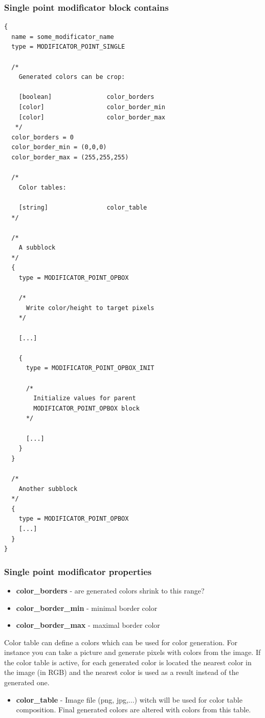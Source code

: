 \documentclass[9pt]{article}
\begin{document}
\subsubsection*{Single point modificator block contains}
\begin{verbatim}
{
  name = some_modificator_name
  type = MODIFICATOR_POINT_SINGLE
  
  /*
    Generated colors can be crop:
  
    [boolean]               color_borders
    [color]                 color_border_min
    [color]                 color_border_max
   */
  color_borders = 0
  color_border_min = (0,0,0)
  color_border_max = (255,255,255)
  
  /*
    Color tables:
          
    [string]                color_table
  */
  
  /*
    A subblock
  */
  {
    type = MODIFICATOR_POINT_OPBOX
    
    /*
      Write color/height to target pixels
    */
    
    [...]
    
    {
      type = MODIFICATOR_POINT_OPBOX_INIT
      
      /*
        Initialize values for parent 
        MODIFICATOR_POINT_OPBOX block
      */
            
      [...]
    }
  }
  
  /*
    Another subblock
  */
  {
    type = MODIFICATOR_POINT_OPBOX
    [...]
  }
}
\end{verbatim}
\subsubsection*{Single point modificator properties}

\begin{itemize}
\item{\bf color\_borders} - are generated colors shrink to this range?
\item{\bf color\_border\_min} - minimal border color
\item{\bf color\_border\_max} - maximal border color
\end{itemize}
Color table can define a colors which can be used for color generation. 
For instance you can take a picture and generate pixels with colors from
the image. If the color table is active, for each generated
color is located the nearest color in the image (in RGB) and the nearest 
color is used as a result instead of the generated one.
\begin{itemize}
\item{\bf color\_table} - Image file (png, jpg,...) witch will be used for 
color table composition. Final generated colors are altered with colors from this table.
\end{itemize}
\end{document}
